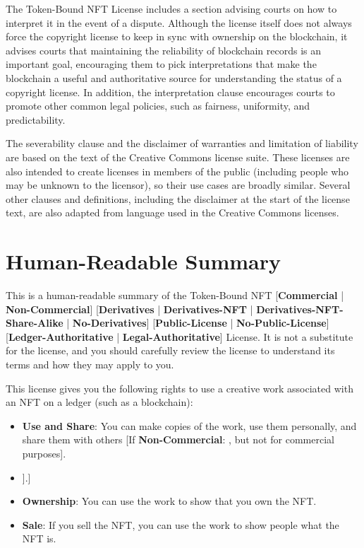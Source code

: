 \documentclass{article}
\newcommand{\iccclicense}{Token-Bound NFT License\xspace}
\newcommand{\keyword}[1]{\textbf{#1}\xspace}
\newcommand{\publiclicense}{\keyword{Public-License}}
\newcommand{\nopubliclicense}{\keyword{No-Public-License}}
\newcommand{\commercial}{\keyword{Commercial}}
\newcommand{\noncommercial}{\keyword{Non-Commercial}}
\newcommand{\noderivative}{\keyword{No-Derivatives}}
\newcommand{\derivative}{\keyword{Derivatives}}
\newcommand{\derivativetracking}{\keyword{Derivatives-NFT}}
\newcommand{\sharealike}{\keyword{Derivatives-NFT-Share-Alike}}
\newcommand{\ledger}{\keyword{Ledger-Authoritative}}
\newcommand{\legal}{\keyword{Legal-Authoritative}}
\newcommand{\iflicenseoption}[2]{[\colorbox{light-gray}{If #1:} #2]}
\newcommand{\ifnotlicenseoption}[2]{[\colorbox{light-gray}{Unless #1:} #2]}
\begin{document}
The \iccclicense includes a section advising courts on how to interpret it in the event of a dispute. Although the license itself does not always force the copyright license to keep in sync with ownership on the blockchain, it advises courts that maintaining the reliability of blockchain records is an important goal, encouraging them to pick interpretations that make the blockchain a useful and authoritative source for understanding the status of a copyright license. In addition, the interpretation clause encourages courts to promote other common legal policies, such as fairness, uniformity, and predictability.

The severability clause and the disclaimer of warranties and limitation of liability are based on the text of the Creative Commons license suite. These licenses are also intended to create licenses in members of the public (including people who may be unknown to the licensor), so their use cases are broadly similar. Several other clauses and definitions, including the disclaimer at the start of the license text, are also adapted from language used in the Creative Commons licenses.

\appendix

\section{Human-Readable Summary}
\label{sec:human}

This is a human-readable summary of the Token-Bound NFT [\commercial{} | \noncommercial{}] [\derivative{} | \derivativetracking{} | \sharealike{} | \noderivative{}]  [\publiclicense{} | \nopubliclicense{}] [\ledger{} | \legal{}] License. It is not a substitute for the license, and you should carefully review the license to understand its terms and how they may apply to you.

This license gives you the following rights to use a creative work associated with an NFT on a ledger (such as a blockchain): 

\begin{itemize}
\item \textbf{Use and Share}: You can make copies of the work, use them personally, and share them with others \iflicenseoption{\noncommercial}{, but not for commercial purposes}.
\item \ifnotlicenseoption{\noderivative}{\textbf{Derivatives}: you can make new works that include and build on the work, use them, and share them with others \iflicenseoption{\noncommercial}{, but not for commercial purposes} \iflicenseoption{\derivativetracking}{, provided that you also release them as NFTs on the same technical standard and on the same ledger traceable by looking at the original NFT \iflicenseoption{\sharealike}{under the same license}}.}
\item \textbf{Ownership}: You can use the work to show that you own the NFT.
\item \textbf{Sale}: If you sell the NFT, you can use the work to show people what the NFT is.
\end{itemize}
\end{document}
